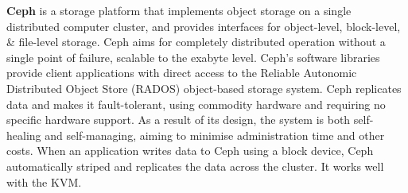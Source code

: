 \documentclass[a4paper,11pt]{article}
\begin{document}
\textbf{Ceph} is a storage platform that implements object storage on a single distributed computer cluster, and provides interfaces for object-level, block-level, \& file-level storage.
Ceph aims for completely distributed operation without a single point of failure, scalable to the exabyte level.
Ceph's software libraries provide client applications with direct access to the Reliable Autonomic Distributed Object Store (RADOS) object-based storage system.
Ceph replicates data and makes it fault-tolerant, using commodity hardware and requiring no specific hardware support.
As a result of its design, the system is both self-healing and self-managing, aiming to minimise administration time and other costs.
When an application writes data to Ceph using a block device, Ceph automatically striped and replicates the data across the cluster.
It works well with the KVM.
\end{document}
